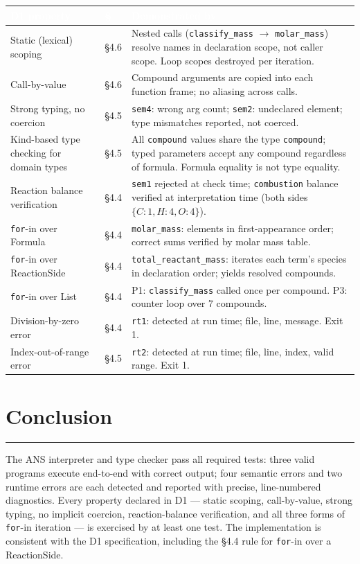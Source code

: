 \documentclass[11pt,a4paper]{article}
\newcommand{\code}[1]{\texttt{#1}}
\newcommand{\sectionrule}{\vspace{-3pt}\textcolor{ansborder}{\rule{\textwidth}{0.6pt}}\vspace{2pt}}
\begin{document}
\vspace{2pt}
\small
{}
\begin{tabularx}{\textwidth}{@{} L{3.8cm} L{1.0cm} Y @{}}
\toprule
{}
\textcolor{white}{\textbf{D1 property}} &
\textcolor{white}{\textbf{§}} &
\textcolor{white}{\textbf{Demonstrated by}} \\
\midrule
Static (lexical) scoping &
§4.6 &
Nested calls (\code{classify\_mass} $\to$ \code{molar\_mass}) resolve names in
declaration scope, not caller scope. Loop scopes destroyed per iteration. \\
Call-by-value &
§4.6 &
Compound arguments are copied into each function frame; no aliasing across calls. \\
Strong typing, no coercion &
§4.5 &
\code{sem4}: wrong arg count; \code{sem2}: undeclared element; type mismatches
reported, not coerced. \\
Kind-based type checking for domain types &
§4.5 &
All \code{compound} values share the type \code{compound}; typed parameters accept
any compound regardless of formula. Formula equality is not type equality. \\
Reaction balance verification &
§4.4 &
\code{sem1} rejected at check time; \code{combustion} balance verified at
interpretation time (both sides $\{C{:}1,H{:}4,O{:}4\}$). \\
\code{for}-in over Formula &
§4.4 &
\code{molar\_mass}: elements in first-appearance order; correct sums verified
by molar mass table. \\
\code{for}-in over ReactionSide &
§4.4 &
\code{total\_reactant\_mass}: iterates each term's species in declaration order;
yields resolved compounds. \\
\code{for}-in over List &
§4.4 &
P1: \code{classify\_mass} called once per compound. P3: counter loop over 7
compounds. \\
Division-by-zero error &
§4.4 &
\code{rt1}: detected at run time; file, line, message. Exit 1. \\
Index-out-of-range error &
§4.5 &
\code{rt2}: detected at run time; file, line, index, valid range. Exit 1. \\
\bottomrule
\end{tabularx}
\normalsize

\section{Conclusion}
\sectionrule

The ANS interpreter and type checker pass all required tests: three valid programs
execute end-to-end with correct output; four semantic errors and two runtime errors
are each detected and reported with precise, line-numbered diagnostics. Every
property declared in D1 --- static scoping, call-by-value, strong typing, no
implicit coercion, reaction-balance verification, and all three forms of
\code{for}-in iteration --- is exercised by at least one test. The implementation
is consistent with the D1 specification, including the §4.4 rule for
\code{for}-in over a ReactionSide.
\end{document}
